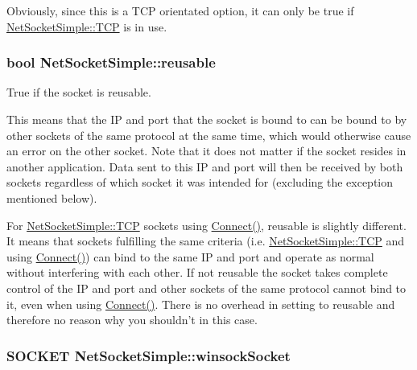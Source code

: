 Obviously, since this is a TCP orientated option, it can only be true if \hyperlink{class_net_socket_simple_a31450636f6fb9ece239c50f616e0d7b0ad093d601c519b54e673755f915cd6467}{NetSocketSimple::TCP} is in use. \hypertarget{class_net_socket_simple_a0921fd02f526c403ce5143d8fdec77fa}{
\subsubsection[{reusable}]{\setlength{\rightskip}{0pt plus 5cm}bool {\bf NetSocketSimple::reusable}}}
\label{class_net_socket_simple_a0921fd02f526c403ce5143d8fdec77fa}


True if the socket is reusable. 

This means that the IP and port that the socket is bound to can be bound to by other sockets of the same protocol at the same time, which would otherwise cause an error on the other socket. Note that it does not matter if the socket resides in another application. Data sent to this IP and port will then be received by both sockets regardless of which socket it was intended for (excluding the exception mentioned below).\par
\par


For \hyperlink{class_net_socket_simple_a31450636f6fb9ece239c50f616e0d7b0ad093d601c519b54e673755f915cd6467}{NetSocketSimple::TCP} sockets using \hyperlink{class_net_socket_simple_a8b3d61a80b904f12791144ba336cf37b}{Connect()}, reusable is slightly different. It means that sockets fulfilling the same criteria (i.e. \hyperlink{class_net_socket_simple_a31450636f6fb9ece239c50f616e0d7b0ad093d601c519b54e673755f915cd6467}{NetSocketSimple::TCP} and using \hyperlink{class_net_socket_simple_a8b3d61a80b904f12791144ba336cf37b}{Connect()}) can bind to the same IP and port and operate as normal without interfering with each other. If not reusable the socket takes complete control of the IP and port and other sockets of the same protocol cannot bind to it, even when using \hyperlink{class_net_socket_simple_a8b3d61a80b904f12791144ba336cf37b}{Connect()}. There is no overhead in setting to reusable and therefore no reason why you shouldn't in this case. \hypertarget{class_net_socket_simple_ace6b7feadf536e09181b23d45c92cc5f}{
\subsubsection[{winsockSocket}]{\setlength{\rightskip}{0pt plus 5cm}SOCKET {\bf NetSocketSimple::winsockSocket}}}
\label{class_net_socket_simple_ace6b7feadf536e09181b23d45c92cc5f}


